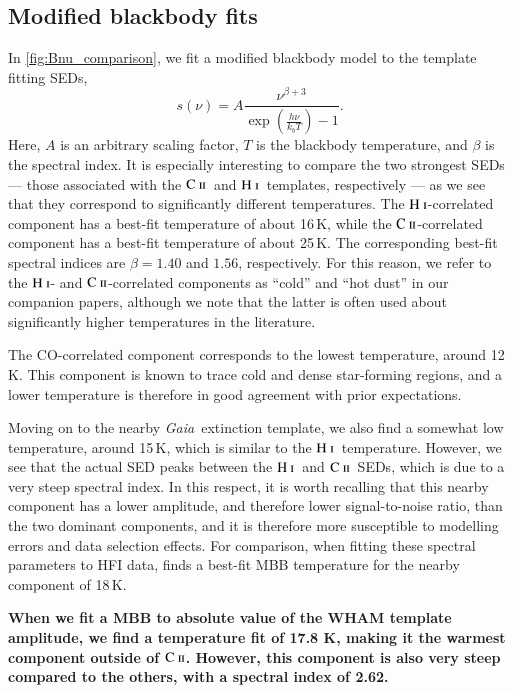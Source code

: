 \documentclass{aa}
\newcommand{\mathsc}[1]{{\normalfont\textsc{#1}}}
\def\GAIA{\textit{Gaia}}
\newcommand{\CII}{\ensuremath{\mathsc{C\ ii}}}
\newcommand{\HI}{\ensuremath{\mathsc{H\ i}}}
\begin{document}
\subsection{Modified blackbody fits}
\label{sec:mbb}
In \cref{fig:Bnu_comparison}, we fit a modified blackbody model
to the template fitting SEDs,
\begin{equation}
    s(\nu) = A \frac{\nu^{\beta + 3}}{\exp{(\frac{h\nu}{k_b T})} - 1}.
\end{equation}
Here, $A$ is an arbitrary scaling factor, $T$ is the blackbody
temperature, and $\beta$ is the spectral index. It is especially
interesting to compare the two strongest SEDs --- those associated
with the \CII\ and \HI\ templates, respectively --- as we see that they
correspond to significantly different temperatures. The \HI-correlated
component has a best-fit temperature of about 16\,K, while the
\CII-correlated component has a best-fit temperature of about
25\,K. The corresponding best-fit spectral indices are $\beta=1.40$
and $1.56$, respectively. For this reason, we refer to the \HI- and
\CII-correlated components as ``cold'' and ``hot dust'' in our
companion papers, although we note that the latter is often used about
significantly higher temperatures in the literature.

The CO-correlated component corresponds to the lowest temperature,
around 12\,K. This component is known to trace cold and dense
star-forming regions, and a lower temperature is therefore in good
agreement with prior expectations.

Moving on to the nearby \GAIA\ extinction template, we also find a
somewhat low temperature, around 15\,K, which is similar to the \HI\
temperature. However, we see that the actual SED peaks between the \HI\
and \CII\ SEDs, which is due to a very steep spectral index. In this
respect, it is worth recalling that this nearby component has a lower
amplitude, and therefore lower signal-to-noise ratio, than the two
dominant components, and it is therefore more susceptible to modelling
errors and data selection effects. For comparison, when fitting these
spectral parameters to HFI data, \cite{CG02_06} finds a best-fit MBB
temperature for the nearby component of 18\,K. 

\textbf{When we fit a MBB to absolute value of the WHAM template amplitude, we
    find a temperature fit of 17.8 K, making it the warmest component outside
    of \CII. However, this component is also very steep compared to the others,
with a spectral index of 2.62. }
\end{document}
